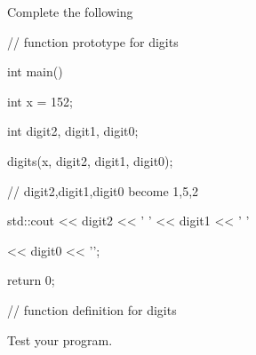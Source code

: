 Complete the following



\begin{consolethree}[escapeinside=||]

// function prototype for digits



int main()

{

    int x = 152;

    int digit2, digit1, digit0;

    digits(x, digit2, digit1, digit0);

    // digit2,digit1,digit0 become 1,5,2

    std::cout << digit2 << ' ' << digit1 << ' '

              << digit0 << '\n';

    return 0;

}



// function definition for digits

\end{consolethree}



Test your program.

